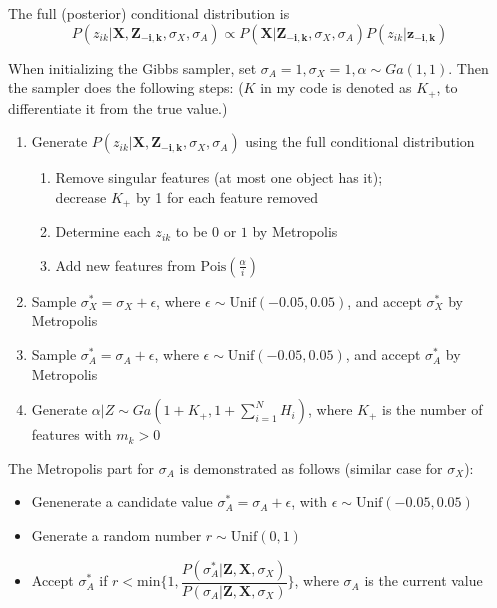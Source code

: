 The full (posterior) conditional distribution is
\begin{equation}
P(z_{ik} | \mathbf{X,Z_{-i,k}},\sigma_X, \sigma_A) \propto P(\mathbf{X} | \mathbf{Z_{-i,k}},\sigma_X, \sigma_A) P(z_{ik} | \mathbf{z_{-i,k}})
\end{equation}

When initializing the Gibbs sampler, set $\sigma_A = 1, \sigma_X = 1, \alpha \sim Ga(1,1)$. Then the sampler does the following steps: ($K$ in my code is denoted as $K_+$, to differentiate it from the true value.)

\begin{enumerate}
\item Generate $P(z_{ik} | \mathbf{X,Z_{-i,k}},\sigma_X, \sigma_A)$ using the full conditional distribution
    \begin{enumerate}
    \item Remove singular features (at most one object has it);\\
    decrease $K_+$ by 1 for each feature removed
    \item Determine each $z_{ik}$ to be $0$ or $1$ by Metropolis
    \item Add new features from $\text{Pois}(\frac{\alpha}{i})$
    \end{enumerate}
\item Sample $\sigma_{X}^* = \sigma_X + \epsilon$, where $\epsilon \sim \text{Unif}(-0.05,0.05)$, and accept $\sigma_{X}^*$ by Metropolis 
\item Sample $\sigma_{A}^* = \sigma_A + \epsilon$, where $\epsilon \sim \text{Unif}(-0.05,0.05)$, and accept $\sigma_{A}^*$ by Metropolis 
\item Generate $\alpha|Z \sim Ga(1+K_+,1+\sum^{N}_{i=1}H_i)$, where $K_+$ is the number of features with $m_k > 0$
\end{enumerate}

The Metropolis part for $\sigma_A$ is demonstrated as follows (similar case for $\sigma_X$):
\begin{itemize}
\item Genenerate a candidate value $\sigma_{A}^{*} = \sigma_{A} + \epsilon$, with $\epsilon \sim \text{Unif}(-0.05,0.05)$
\item Generate a random number $r \sim \text{Unif}(0,1)$
\item Accept $\sigma_{A}^{*}$ if $r < \text{min}\{ 1, \dfrac{P(\sigma_{A}^{*} | \mathbf{Z,X},\sigma_X)}{P(\sigma_{A} | \mathbf{Z,X},\sigma_X)} \}$, where $\sigma_{A}$ is the current value
\end{itemize}

